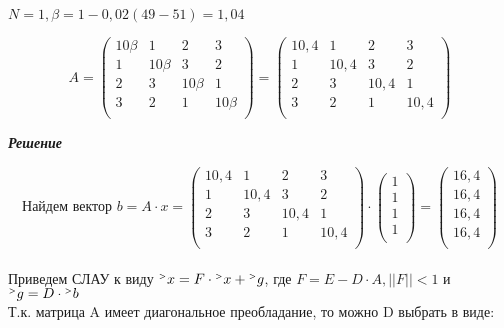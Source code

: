 \documentclass[12pt]{article}
\begin{document}
$N = 1, \beta = 1-0,02(49-51) = 1,04$

\begin{equation*}
	A = \left(
	\begin{array}{cccc}
		10\beta & 1 & 2 & 3\\
		1 & 10\beta & 3 & 2\\
		2 & 3 & 10\beta & 1\\
		3 & 2 & 1 & 10\beta\\
	\end{array}
	\right)
	=
	\left(
	\begin{array}{cccc}
		10,4 & 1 & 2 & 3\\
		1 & 10,4 & 3 & 2\\
		2 & 3 & 10,4 & 1\\
		3 & 2 & 1 & 10,4\\
	\end{array}
	\right)
\end{equation*}
\begin{center}
	\textbf{\textit{Решение}}
\end{center}
\begin{equation*}
\text{Найдем вектор } b = A \cdot x = \left(
\begin{array}{cccc}
	10,4 & 1 & 2 & 3\\
	1 & 10,4 & 3 & 2\\
	2 & 3 & 10,4 & 1\\
	3 & 2 & 1 & 10,4\\
\end{array}
\right) \cdot
\left(
\begin{array}{c}
	1\\ 1\\ 1\\	1\\
\end{array}\right) = 
\left(
\begin{array}{c}
	16,4\\ 16,4\\ 16,4\\ 16,4\\
\end{array}\right)
\end{equation*}\\
Приведем СЛАУ к виду ${}^{\mathsmaller{>}} x = 
F \cdot {}^{\mathsmaller{>}} x + {}^{\mathsmaller{>}} g$, где
$F = E - D \cdot A, ||F|| < 1 $ и $ {}^{\mathsmaller{>}} g = D \cdot {}^{\mathsmaller{>}} b$\\
Т.к. матрица A имеет диагональное преобладание, то можно D выбрать в виде:
\end{document}
